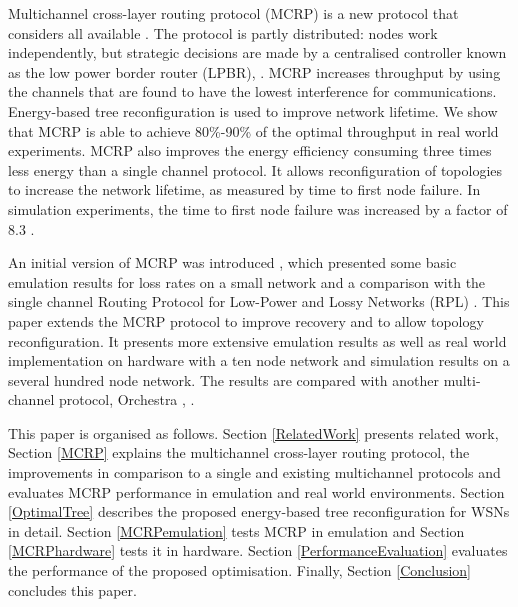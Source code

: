 Multichannel cross-layer routing protocol (MCRP) is a new protocol that considers all available . The protocol is partly distributed: nodes work independently, but strategic decisions are made by a centralised controller known as the low power border router (LPBR), . MCRP increases throughput by using the channels that are found to have the lowest interference for communications.
Energy-based tree reconfiguration is  used to improve network lifetime.  We show that MCRP is able to achieve 80\%-90\% of the optimal  throughput in real world experiments.
MCRP also improves the energy efficiency consuming three times less energy than a single channel protocol.  It allows reconfiguration of topologies to increase the network lifetime, as measured by time to first node failure.  In simulation experiments, the time to first node failure was increased by a factor of 8.3 .

An initial version of MCRP was introduced  \cite{mcrp}, which presented some basic emulation results for loss rates on a small network and a comparison with the single channel Routing Protocol for Low-Power and Lossy Networks (RPL) \cite{winter2012rpl}.  This paper extends the MCRP protocol to improve recovery and to allow topology reconfiguration.  It presents more extensive emulation results as well as real world implementation on hardware with a ten node network and simulation results on a several hundred node network.  The results are compared with another multi-channel protocol, Orchestra \cite{orchestra}, .

This paper is organised as follows. Section \ref{RelatedWork} presents  related work, Section \ref{MCRP} explains the multichannel cross-layer routing protocol, the improvements in comparison to a single and existing multichannel protocols and evaluates MCRP performance in emulation and real world environments.
Section \ref{OptimalTree} describes the proposed energy-based tree reconfiguration for WSNs in detail.  Section \ref{MCRPemulation} tests MCRP in emulation and Section \ref{MCRPhardware} tests it in hardware.
Section \ref{PerformanceEvaluation} evaluates the performance of the proposed optimisation. Finally, Section \ref{Conclusion} concludes this paper.
